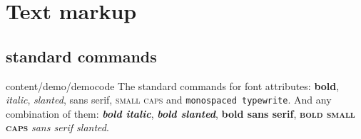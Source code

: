

\makeatletter
\renewcommand\FrameCommand{\fcolorbox{demo@rulecolor}{demo@resultbackcolor}}
\makeatother

\ifcsdef{}{\newcommand{\latex}{\LaTeX{}}}
\newcommand{\democodepath}{content/demo/}
\renewcommand{\democodefile}{content/demo/democode}

  {}%
  {%
    \newlength{\marginwidth}%
    \setlength{\marginwidth}{\marginparwidth}%
    \addtolength{\marginwidth}{\marginparsep}%
  }





\section{Text markup}

\subsection{\latex{} standard commands}

\begin{filecontents*}{\democodefile}
The standard commands for font attributes:  
\textbf{bold}, \textit{italic}, \textsl{slanted},
\textsf{sans serif}, \textsc{small caps} and
\texttt{monospaced typewrite}.
And any combination of them:
\textit{\textbf{bold italic}},
\textsl{\textbf{bold slanted}},
\textsf{\textbf{bold sans serif}},
\textsc{\textbf{bold small caps}}
\textsl{\textsf{sans serif slanted}}. 
\end{filecontents*}

